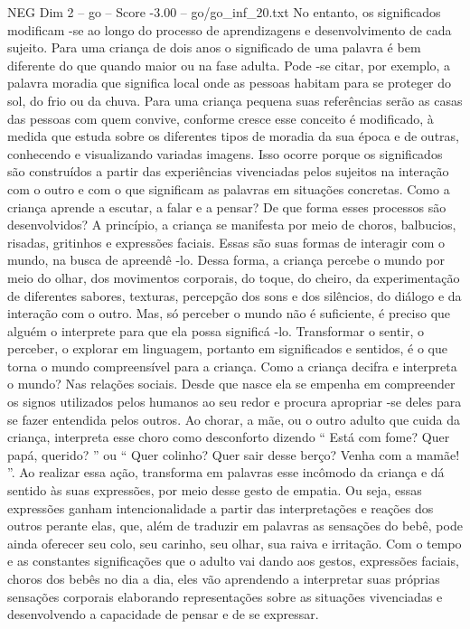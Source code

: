\begin{textsample}{NEG Dim 2 – go – Score -3.00 – go/go\_inf\_20.txt}
No entanto, os significados modificam -se ao longo do processo de aprendizagens e desenvolvimento de cada sujeito.
Para uma criança de dois anos o significado de uma palavra é bem diferente do que quando maior ou na fase adulta.
Pode -se citar, por exemplo, a palavra moradia que significa local onde as pessoas habitam para se proteger do sol, do frio ou da chuva.
Para uma criança pequena suas referências serão as casas das pessoas com quem convive, conforme cresce esse conceito é modificado, à medida que estuda sobre os diferentes tipos de moradia da sua época e de outras, conhecendo e visualizando variadas imagens.
Isso ocorre porque os significados são construídos a partir das experiências vivenciadas pelos sujeitos na interação com o outro e com o que significam as palavras em situações concretas.
Como a criança aprende a escutar, a falar e a pensar?
De que forma esses processos são desenvolvidos?
A princípio, a criança se manifesta por meio de choros, balbucios, risadas, gritinhos e expressões faciais.
Essas são suas formas de interagir com o mundo, na busca de apreendê -lo.
Dessa forma, a criança percebe o mundo por meio do olhar, dos movimentos corporais, do toque, do cheiro, da experimentação de diferentes sabores, texturas, percepção dos sons e dos silêncios, do diálogo e da interação com o outro.
Mas, só perceber o mundo não é suficiente, é preciso que alguém o interprete para que ela possa significá -lo.
Transformar o sentir, o perceber, o explorar em linguagem, portanto em significados e sentidos, é o que torna o mundo compreensível para a criança.
Como a criança decifra e interpreta o mundo?
Nas relações sociais.
Desde que nasce ela se empenha em compreender os signos utilizados pelos humanos ao seu redor e procura apropriar -se deles para se fazer entendida pelos outros.
Ao chorar, a mãe, ou o outro adulto que cuida da criança, interpreta esse choro como desconforto dizendo “ Está com fome?
Quer papá, querido? ” ou “ Quer colinho?
Quer sair desse berço?
Venha com a mamãe! ”.
Ao realizar essa ação, transforma em palavras esse incômodo da criança e dá sentido às suas expressões, por meio desse gesto de empatia.
Ou seja, essas expressões ganham intencionalidade a partir das interpretações e reações dos outros perante elas, que, além de traduzir em palavras as sensações do bebê, pode ainda oferecer seu colo, seu carinho, seu olhar, sua raiva e irritação.
Com o tempo e as constantes significações que o adulto vai dando aos gestos, expressões faciais, choros dos bebês no dia a dia, eles vão aprendendo a interpretar suas próprias sensações corporais elaborando representações sobre as situações vivenciadas e desenvolvendo a capacidade de pensar e de se expressar.

\end{textsample}
